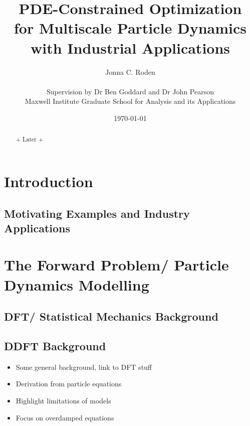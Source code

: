\documentclass[11pt, a4paper]{article}
\title{{\huge PDE-Constrained Optimization \\for Multiscale Particle Dynamics} \\ with Industrial Applications}
\author{Jonna C. Roden\\ \\Supervision by Dr Ben Goddard and Dr John Pearson\\ \vspace{0.5cm} Maxwell Institute Graduate School for Analysis and its Applications}
\date{\today}
\theoremstyle{definition}
\begin{document}
	\maketitle
\begin{abstract}
+ Later +
	
\end{abstract}

\newpage
{} 
\tableofcontents
\newpage
{} 

	
	
	\section{Introduction}
	\subsection{Motivating Examples and Industry Applications}
	
	
	
	
	
	
	\section{The Forward Problem/ Particle Dynamics Modelling}
	
	\subsection{DFT/ Statistical Mechanics Background}
	
	\subsection{DDFT Background}
		\begin{itemize}
			\item Some general background, link to DFT stuff
			\item Derivation from particle equations
			\item Highlight limitations of models
			\item Focus on overdamped equations
		\end{itemize}
		
	
\end{document}
